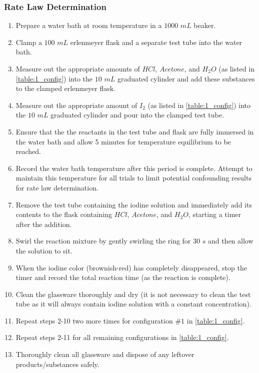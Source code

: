 \subsubsection{Rate Law Determination}
	\begin{enumerate}[itemsep=-1ex]
	  \item Prepare a water bath at room temperature in a $1000$ $mL$ beaker.
	  \item Clamp a $100$ $mL$ erlenmeyer flask and a separate test tube into the water bath.
	  \item Measure out the appropriate amounts of $HCl$, $Acetone$, and $H_2O$ (as listed in \cref{table:1_config}) into the $10$ $mL$ graduated cylinder and add these substances to the clamped erlenmeyer flask.
	  \item Measure out the appropriate amount of $I_2$ (as listed in \cref{table:1_config}) into the $10$ $mL$ graduated cylinder and pour into the clamped test tube.
	  \item Ensure that the the reactants in the test tube and flask are fully immersed in the water bath and allow 5 minutes for temperature equilibrium to be reached.
	  \item Record the water bath temperature after this period is complete. Attempt to maintain this temperature for all trials to limit potential confounding results for rate law determination.
	  \item Remove the test tube containing the iodine solution and immediately add its contents to the flask containing $HCl$, $Acetone$, and $H_2O$, starting a timer after the addition.
	  \item Swirl the reaction mixture by gently swirling the ring for $30$ $s$ and then allow the solution to sit.
	  \item When the iodine color (brownish-red) has completely disappeared, stop the timer and record the total reaction time (as the reaction is complete).
	  \item Clean the glassware thoroughly and dry (it is not necessary to clean the test tube as it will always contain iodine solution with a constant concentration).
	  \item Repeat steps 2-10 two more times for configuration $\#1$ in \cref{table:1_config}.
	  \item Repeat steps 2-11 for all remaining configurations in \cref{table:1_config}.
	  \item Thoroughly clean all glassware and dispose of any leftover products/substances safely.
	\end{enumerate}

